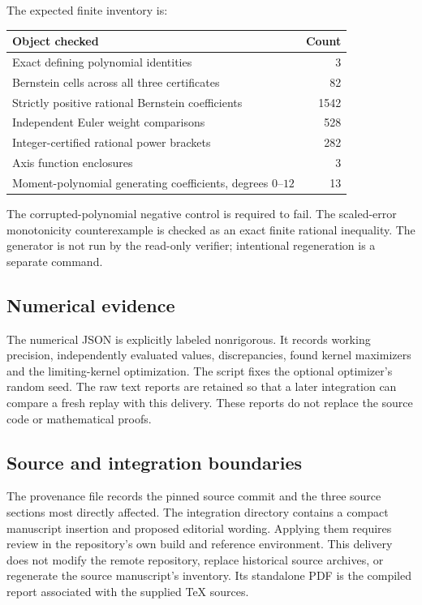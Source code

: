The expected finite inventory is:
\begin{center}
\begin{tabular}{lr}
\toprule
Object checked & Count\\
\midrule
Exact defining polynomial identities & 3\\
Bernstein cells across all three certificates & 82\\
Strictly positive rational Bernstein coefficients & 1542\\
Independent Euler weight comparisons & 528\\
Integer-certified rational power brackets & 282\\
Axis function enclosures & 3\\
Moment-polynomial generating coefficients, degrees $0$--$12$ & 13\\
\bottomrule
\end{tabular}
\end{center}
The corrupted-polynomial negative control is required to fail. The scaled-error monotonicity counterexample is checked as an exact finite rational inequality. The generator is not run by the read-only verifier; intentional regeneration is a separate command.

\subsection{Numerical evidence}
The numerical JSON is explicitly labeled nonrigorous. It records working precision, independently evaluated values, discrepancies, found kernel maximizers and the limiting-kernel optimization. The script fixes the optional optimizer's random seed. The raw text reports are retained so that a later integration can compare a fresh replay with this delivery. These reports do not replace the source code or mathematical proofs.

\subsection{Source and integration boundaries}
The provenance file records the pinned source commit and the three source sections most directly affected. The integration directory contains a compact manuscript insertion and proposed editorial wording. Applying them requires review in the repository's own build and reference environment. This delivery does not modify the remote repository, replace historical source archives, or regenerate the source manuscript's inventory. Its standalone PDF is the compiled report associated with the supplied TeX sources.

